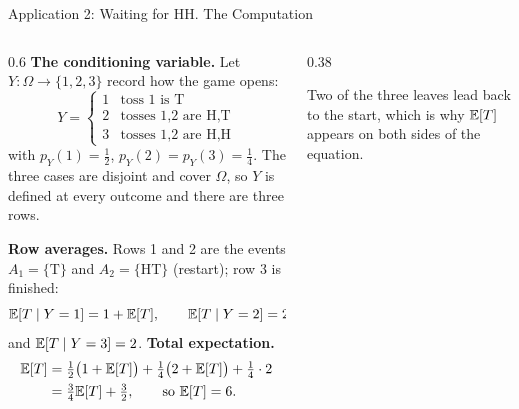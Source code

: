 \begin{frame}{Application 2: Waiting for HH. The Computation}
  \small
  \label{hh}%
  \begin{columns}[T]
    \begin{column}{0.6\textwidth}
      \textbf{The conditioning variable.} Let $Y\colon\Omega\to\{1,2,3\}$ record how the game opens:
      \[
        Y=\begin{cases}1&\text{toss 1 is T}\\2&\text{tosses 1,2 are H,T}\\3&\text{tosses 1,2 are H,H}\end{cases}
      \]
      with $p_Y(1)=\tfrac12$, $p_Y(2)=p_Y(3)=\tfrac14$.
      The three cases are disjoint and cover $\Omega$, so $Y$ is defined at every outcome and there are three rows.
      \medskip

      \textbf{Row averages.} Rows 1 and 2 are the events $A_1=\{\text{T}\}$ and $A_2=\{\text{HT}\}$ (restart); row 3 is finished:
      \[
        \mathbb{E}[T\mid Y=1]=1+\mathbb{E}[T],\qquad \mathbb{E}[T\mid Y=2]=2+\mathbb{E}[T],
      \]
      and $\mathbb{E}[T\mid Y=3]=2$.
      \textbf{Total expectation.}
      \begin{align*}
        \mathbb{E}[T]&=\tfrac12\big(1+\mathbb{E}[T]\big)+\tfrac14\big(2+\mathbb{E}[T]\big)+\tfrac14\cdot2\\
             &=\tfrac34\mathbb{E}[T]+\tfrac32,\qquad\text{so }\mathbb{E}[T]=6 .
      \end{align*}
    \end{column}
    \begin{column}{0.38\textwidth}
      \centering
      \par\medskip
      {\footnotesize Two of the three leaves lead back to the start, which is why $\mathbb{E}[T]$ appears on both sides of the equation.}
    \end{column}
  \end{columns}
\end{frame}

